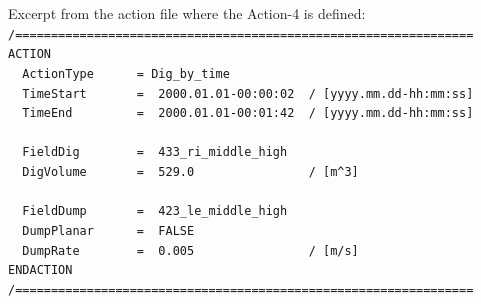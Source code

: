\newpage
Excerpt from the action file where the Action-4 is defined:
\\ \hspace*{3mm} \texttt{\small{/================================================================}}
\\ \hspace*{3mm} \texttt{\small{ACTION}}
\\ \hspace*{3mm} \texttt{\small{~~ActionType~~~~~~=~Dig\_by\_time}}
\\ \hspace*{3mm} \texttt{\small{~~TimeStart~~~~~~~=~~2000.01.01-00:00:02~~/~[yyyy.mm.dd-hh:mm:ss]}}
\\ \hspace*{3mm} \texttt{\small{~~TimeEnd~~~~~~~~~=~~2000.01.01-00:01:42~~/~[yyyy.mm.dd-hh:mm:ss]}}
\\ \hspace*{3mm}
\\ \hspace*{3mm} \texttt{\small{~~FieldDig~~~~~~~~=~~433\_ri\_middle\_high}}
\\ \hspace*{3mm} \texttt{\small{~~DigVolume~~~~~~~=~~529.0~~~~~~~~~~~~~~~~/~[m\textasciicircum3]}}
\\ \hspace*{3mm}
\\ \hspace*{3mm} \texttt{\small{~~FieldDump~~~~~~~=~~423\_le\_middle\_high}}
\\ \hspace*{3mm} \texttt{\small{~~DumpPlanar~~~~~~=~~FALSE}}
\\ \hspace*{3mm} \texttt{\small{~~DumpRate~~~~~~~~=~~0.005~~~~~~~~~~~~~~~~/~[m/s]}}
\\ \hspace*{3mm} \texttt{\small{ENDACTION}}
\\ \hspace*{3mm} \texttt{\small{/================================================================}}



\newpage
